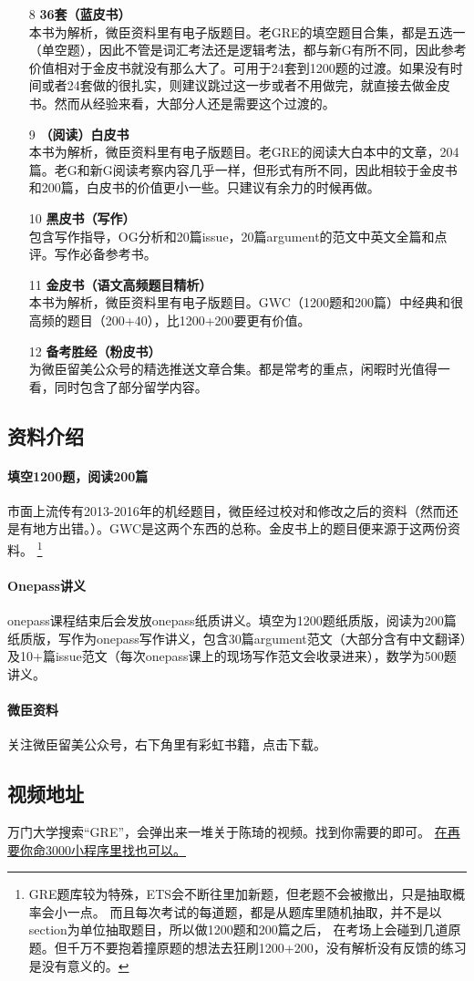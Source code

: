 \documentclass[blue, pc, cn]{elegantnote}
\begin{document}
\begin{enumerate}
            \item[8]\textbf{36套（蓝皮书）}\\本书为解析，微臣资料里有电子版题目。老GRE的填空题目合集，都是五选一（单空题），因此不管是词汇考法还是逻辑考法，都与新G有所不同，因此参考价值相对于金皮书就没有那么大了。可用于24套到1200题的过渡。如果没有时间或者24套做的很扎实，则建议跳过这一步或者不用做完，就直接去做金皮书。然而从经验来看，大部分人还是需要这个过渡的。
            \item[9]\textbf{（阅读）白皮书}\\本书为解析，微臣资料里有电子版题目。老GRE的阅读大白本中的文章，204篇。老G和新G阅读考察内容几乎一样，但形式有所不同，因此相较于金皮书和200篇，白皮书的价值更小一些。只建议有余力的时候再做。
            \item[10]\textbf{黑皮书（写作）}\\包含写作指导，OG分析和20篇issue，20篇argument的范文中英文全篇和点评。写作必备参考书。
            \item[11]\textbf{金皮书（语文高频题目精析）}\\本书为解析，微臣资料里有电子版题目。GWC（1200题和200篇）中经典和很高频的题目（200+40），比1200+200要更有价值。
            \item[12]\textbf{备考胜经（粉皮书）}\\为微臣留美公众号的精选推送文章合集。都是常考的重点，闲暇时光值得一看，同时包含了部分留学内容。
        \end{enumerate}

    \subsection{资料介绍}
        \paragraph{填空1200题，阅读200篇}
        市面上流传有2013-2016年的机经题目，微臣经过校对和修改之后的资料（然而还是有地方出错。）。GWC是这两个东西的总称。金皮书上的题目便来源于这两份资料。
        \footnote{GRE题库较为特殊，ETS会不断往里加新题，但老题不会被撤出，只是抽取概率会小一点。
        而且每次考试的每道题，都是从题库里随机抽取，并不是以section为单位抽取题目，所以做1200题和200篇之后，
        在考场上会碰到几道原题。但千万不要抱着撞原题的想法去狂刷1200+200，没有解析没有反馈的练习是没有意义的。}

        \paragraph{Onepass讲义}
        onepass课程结束后会发放onepass纸质讲义。填空为1200题纸质版，阅读为200篇纸质版，写作为onepass写作讲义，包含30篇argument范文（大部分含有中文翻译）及10+篇issue范文（每次onepass课上的现场写作范文会收录进来），数学为500题讲义。

        \paragraph{微臣资料}
        关注微臣留美公众号，右下角里有彩虹书籍，点击下载。

    \subsection{视频地址}	万门大学搜索“GRE”，会弹出来一堆关于陈琦的视频。找到你需要的即可。
                    \underline{在再要你命3000小程序里找也可以。}
\end{document}
